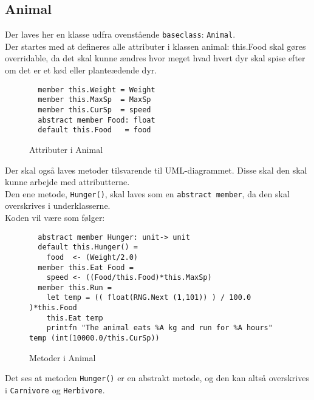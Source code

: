 \documentclass[a4paper,10pt]{article}
\begin{document}
\subsection{Animal}
Der laves her en klasse udfra ovenstående \texttt{baseclass}: \texttt{Animal}. \\
Der startes med at defineres alle attributer i klassen animal: this.Food skal gøres overridable, da det skal kunne ændres hvor meget hvad hvert dyr skal spise efter om det er et kød eller planteædende dyr.
\begin{figure}[H]
\lstset{language=FSharp}  
\begin{lstlisting}
  member this.Weight = Weight
  member this.MaxSp  = MaxSp
  member this.CurSp  = speed
  abstract member Food: float
  default this.Food   = food
\end{lstlisting}
    \centering
    \caption{Attributer i Animal}
    \label{fig:my_label}
\end{figure}
Der skal også laves metoder tilsvarende til UML-diagrammet. 
Disse skal den skal kunne arbejde med attributterne. \\
Den ene metode, \texttt{Hunger()}, skal laves som en \texttt{abstract member}, da den skal overskrives i underklasserne.\\
Koden vil være som følger:
\begin{figure}[H]
\lstset{language=FSharp}  
\begin{lstlisting}
  abstract member Hunger: unit-> unit
  default this.Hunger() =
    food  <- (Weight/2.0)
  member this.Eat Food =
    speed <- ((Food/this.Food)*this.MaxSp)
  member this.Run =
    let temp = (( float(RNG.Next (1,101)) ) / 100.0 )*this.Food
    this.Eat temp
    printfn "The animal eats %A kg and run for %A hours" temp (int(10000.0/this.CurSp))
\end{lstlisting}
    \centering
    \caption{Metoder i Animal}
    \label{fig:my_label}
\end{figure}
Det ses at metoden \texttt{Hunger()} er en abstrakt metode, og den kan altså overskrives i \texttt{Carnivore} og \texttt{Herbivore}. 
\end{document}
